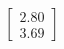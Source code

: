 \documentclass[preview]{standalone}
\begin{document}
\begin{align*}
\begin{bmatrix} 2.80 \\ 3.69 \end{bmatrix}
\end{align*}
\end{document}

